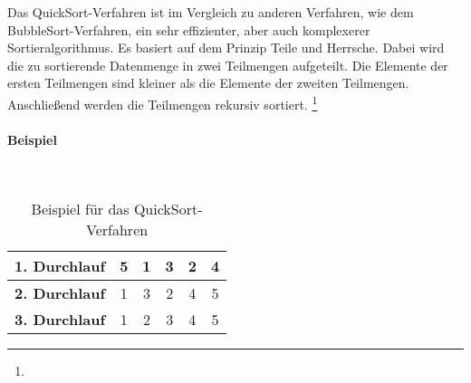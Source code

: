 \documentclass[./entry.tex]{subfiles}
\begin{document}
    Das \dq QuickSort\dq-Verfahren ist im Vergleich zu anderen Verfahren,
    wie dem \dq BubbleSort\dq-Verfahren, ein sehr effizienter, aber auch komplexerer
    Sortieralgorithmus.
    Es basiert auf dem Prinzip \dq Teile und Herrsche\dq.
    Dabei wird die zu sortierende Datenmenge in zwei Teilmengen aufgeteilt.
    Die Elemente der ersten Teilmengen sind kleiner als die Elemente der zweiten Teilmengen.
    Anschließend werden die Teilmengen rekursiv sortiert.
    \footnote{}

    \paragraph{Beispiel} \mbox{}\\

    \begin{table}[h]
        \centering
        \begin{tabular}{|c|c|c|c|c|c|}
            \hline
            \textbf{1. Durchlauf} & 5 & 1 & 3 & 2 & 4\\
            \hline
            \textbf{2. Durchlauf} & 1 & 3 & 2 & 4 & 5\\
            \hline
            \textbf{3. Durchlauf} & 1 & 2 & 3 & 4 & 5\\
            \hline
        \end{tabular}
        \caption{Beispiel für das \dq QuickSort\dq-Verfahren}
        \label{tab:quicksort}
    \end{table}
\end{document}
